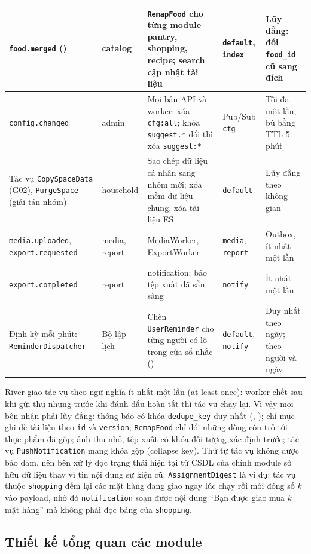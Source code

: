 {\begin{longtable}{|L{3.9cm}|L{1.7cm}|L{\dimexpr{}\arrayrulewidth-3.9cm-1.7cm-1.8cm-2.9cm\relax}|L{1.8cm}|L{2.9cm}|}
\texttt{food.merged} () & catalog & \texttt{RemapFood} cho từng module pantry, shopping, recipe; search cập nhật tài liệu & \texttt{default}, \texttt{index} & Lũy đẳng: đổi \texttt{food\_id} cũ sang đích\\ \hline
\texttt{config.changed} & admin & Mọi bản API và worker: xóa \texttt{cfg:all}; khóa \texttt{suggest.*} đổi thì xóa \texttt{suggest:*} & Pub/Sub \texttt{cfg} & Tối đa một lần, bù bằng TTL 5 phút\\ \hline
Tác vụ \texttt{CopySpaceData} (G02), \texttt{PurgeSpace} (giải tán nhóm) & household & Sao chép dữ liệu cá nhân sang nhóm mới; xóa mềm dữ liệu chung, xóa tài liệu ES & \texttt{default} & Lũy đẳng theo không gian\\ \hline
\texttt{media.uploaded}, \texttt{export.requested} & media, report & MediaWorker, ExportWorker & \texttt{media}, \texttt{report} & Outbox, ít nhất một lần\\ \hline
\texttt{export.completed} & report & notification: báo tệp xuất đã sẵn sàng & \texttt{notify} & Ít nhất một lần\\ \hline
Định kỳ mỗi phút: \texttt{ReminderDispatcher} & Bộ lập lịch & Chèn \texttt{UserReminder} cho từng người có lô trong cửa sổ nhắc () & \texttt{default}, \texttt{notify} & Duy nhất theo ngày; theo người và ngày\\ \hline
\end{longtable}
}

River giao tác vụ theo ngữ nghĩa ít nhất một lần (at-least-once): worker chết sau khi gửi thư nhưng trước khi đánh dấu hoàn tất thì tác vụ chạy lại. Vì vậy mọi bên nhận phải lũy đẳng: thông báo có khóa \texttt{dedupe\_key} duy nhất (, ); chỉ mục ghi đè tài liệu theo \texttt{id} và \texttt{version}; \texttt{RemapFood} chỉ đổi những dòng còn trỏ tới thực phẩm đã gộp; ảnh thu nhỏ, tệp xuất có khóa đối tượng xác định trước; tác vụ \texttt{PushNotification} mang khóa gộp (collapse key). Thứ tự tác vụ không được bảo đảm, nên bên xử lý đọc trạng thái hiện tại từ CSDL của chính module sở hữu dữ liệu thay vì tin nội dung sự kiện cũ. \texttt{AssignmentDigest} là ví dụ: tác vụ thuộc \texttt{shopping} đếm lại các mặt hàng đang giao ngay lúc chạy rồi mới đóng số $k$ vào payload, nhờ đó \texttt{notification} soạn được nội dung “Bạn được giao mua $k$ mặt hàng” mà không phải đọc bảng của \texttt{shopping}.

\subsection{Thiết kế tổng quan các module}\label{ssec:tong-quan-module}

